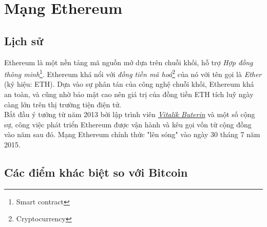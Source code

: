 \section{Mạng Ethereum}

\subsection{Lịch sử}

Ethereum là một nền tảng mã nguồn mở dựa trên chuỗi khối, hỗ trợ \textit{Hợp đồng thông minh}\footnote{Smart contract}. Ethereum khá nổi với \textit{đồng tiền mã hoá}\footnote{Cryptocurrency} của nó với tên gọi là \textit{Ether} (ký hiệu: ETH). Dựa vào sự phân tán của công nghệ chuỗi khối, Ethereum khá an toàn, và cũng nhờ bảo mật cao nên giá trị của đồng tiền ETH tích luỹ ngày càng lớn trên thị trường tiện điện tử.\\

Bắt đầu ý tưởng từ năm 2013 bởi lập trình viên \href{https://en.wikipedia.org/wiki/Vitalik_Buterin}{\textit{Vitalik Buterin}} và một số cộng sự, công việc phát triển Ethereum được vận hành và kêu gọi vốn từ cộng đồng vào năm sau đó. Mạng Ethereum chính thức "lên sóng" vào ngày 30 tháng 7 năm 2015.\\

\subsection{Các điểm khác biệt so với Bitcoin}

